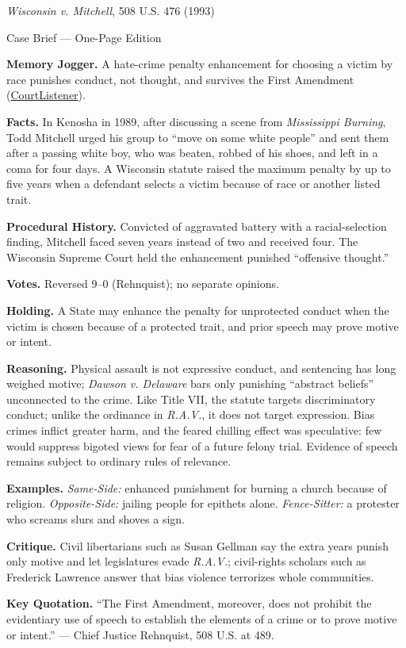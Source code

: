 \documentclass[12pt]{article}
\begin{document}
\begin{center}
{\Large \textit{Wisconsin v. Mitchell}, 508 U.S. 476 (1993)\par}
\vspace{0.3em}
{\normalsize Case Brief --- One-Page Edition\par}
\end{center}

\textbf{Memory Jogger.} A hate-crime penalty enhancement for choosing a victim by race punishes conduct, not thought, and survives the First Amendment (\href{https://www.courtlistener.com/opinion/112879/wisconsin-v-mitchell/}{CourtListener}).

\textbf{Facts.} In Kenosha in 1989, after discussing a scene from \textit{Mississippi Burning}, Todd Mitchell urged his group to ``move on some white people'' and sent them after a passing white boy, who was beaten, robbed of his shoes, and left in a coma for four days. A Wisconsin statute raised the maximum penalty by up to five years when a defendant selects a victim because of race or another listed trait.

\textbf{Procedural History.} Convicted of aggravated battery with a racial-selection finding, Mitchell faced seven years instead of two and received four. The Wisconsin Supreme Court held the enhancement punished ``offensive thought.''

\textbf{Votes.} Reversed 9--0 (Rehnquist); no separate opinions.

\textbf{Holding.} A State may enhance the penalty for unprotected conduct when the victim is chosen because of a protected trait, and prior speech may prove motive or intent.

\textbf{Reasoning.} Physical assault is not expressive conduct, and sentencing has long weighed motive; \textit{Dawson v. Delaware} bars only punishing ``abstract beliefs'' unconnected to the crime. Like Title VII, the statute targets discriminatory conduct; unlike the ordinance in \textit{R.A.V.}, it does not target expression. Bias crimes inflict greater harm, and the feared chilling effect was speculative: few would suppress bigoted views for fear of a future felony trial. Evidence of speech remains subject to ordinary rules of relevance.

\textbf{Examples.} \emph{Same-Side:} enhanced punishment for burning a church because of religion. \emph{Opposite-Side:} jailing people for epithets alone. \emph{Fence-Sitter:} a protester who screams slurs and shoves a sign.

\textbf{Critique.} Civil libertarians such as Susan Gellman say the extra years punish only motive and let legislatures evade \textit{R.A.V.}; civil-rights scholars such as Frederick Lawrence answer that bias violence terrorizes whole communities.

\textbf{Key Quotation.} ``The First Amendment, moreover, does not prohibit the evidentiary use of speech to establish the elements of a crime or to prove motive or intent.'' --- Chief Justice Rehnquist, 508 U.S. at 489.
\end{document}
